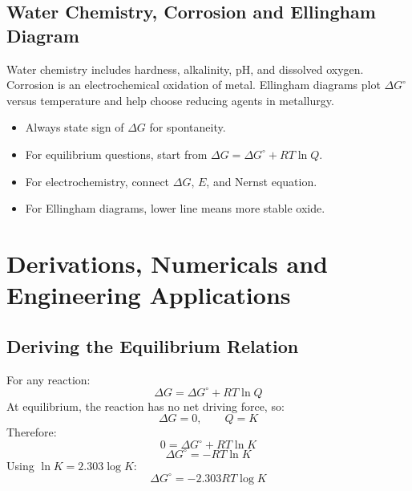 \documentclass[12pt,a4paper]{article}
\begin{document}
\subsection{Water Chemistry, Corrosion and Ellingham Diagram}
Water chemistry includes hardness, alkalinity, pH, and dissolved oxygen. Corrosion is an electrochemical oxidation of metal. Ellingham diagrams plot $\Delta G^\circ$ versus temperature and help choose reducing agents in metallurgy.

\begin{tcolorbox}[tikzbox, title={Ellingham Diagram Concept}]
\centering
{}
\end{tcolorbox}

\begin{tcolorbox}[exambox, title={Exam Points}]
\begin{itemize}[leftmargin=*, itemsep=2pt, topsep=2pt]
  \item Always state sign of $\Delta G$ for spontaneity.
  \item For equilibrium questions, start from $\Delta G=\Delta G^\circ+RT\ln Q$.
  \item For electrochemistry, connect $\Delta G$, $E$, and Nernst equation.
  \item For Ellingham diagrams, lower line means more stable oxide.
\end{itemize}
\end{tcolorbox}

\section{Derivations, Numericals and Engineering Applications}

\subsection{Deriving the Equilibrium Relation}
For any reaction:
\[
\Delta G=\Delta G^\circ+RT\ln Q
\]
At equilibrium, the reaction has no net driving force, so:
\[
\Delta G=0,\qquad Q=K
\]
Therefore:
\[
0=\Delta G^\circ+RT\ln K
\]
\[
\Delta G^\circ=-RT\ln K
\]
Using $\ln K=2.303\log K$:
\[
\Delta G^\circ=-2.303RT\log K
\]
\end{document}
